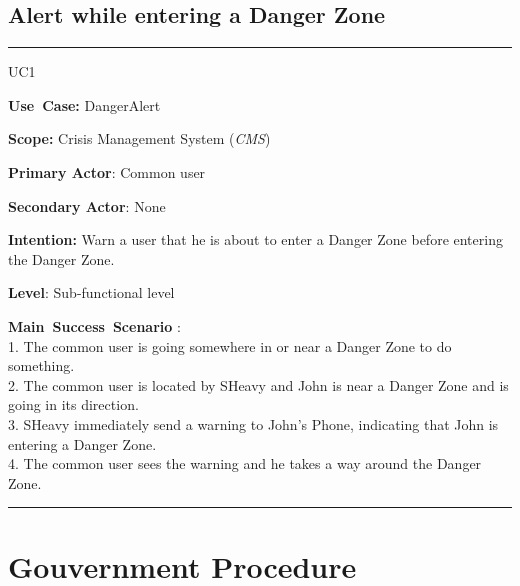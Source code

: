\subsection{Alert while entering a Danger Zone}
\vspace{0.5cm}
\hrule
\vspace{0.5cm}
\begin{lyxlist}{UC1}
\small{
\item [\textbf{Use~Case:}] DangerAlert
\item [\textbf{Scope:}] Crisis Management System (\emph{CMS})
\item [\textbf{Primary Actor}:] Common user
\item [\textbf{Secondary Actor}:] None
\item [\textbf{Intention:}]Warn a user that he is about to enter a Danger Zone 
before entering the Danger Zone.
\item [\textbf{Level}:]Sub-functional level
\item [\textbf{Main~Success~Scenario}]:\\
1. The common user is going somewhere in or near a Danger Zone to do
something.\\
2. The common user is located by SHeavy and John is near a Danger Zone and is
going in its direction.\\
3. SHeavy immediately send a warning to John's Phone, indicating 
that John is entering a Danger Zone.\\
4. The common user sees the warning and he takes a way around the Danger Zone.\\
}
\end{lyxlist}
\hrule
\vspace{0.5cm} 

\section{Gouvernment Procedure}

